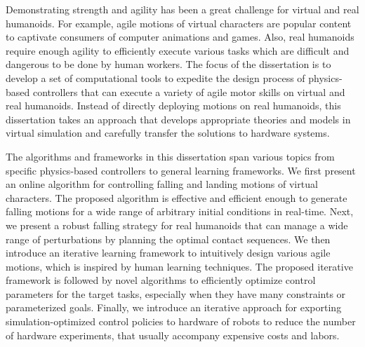 
Demonstrating strength and agility has been a great challenge for virtual and 
real humanoids.
For example, agile motions of virtual characters are popular content to 
captivate consumers of computer animations and games.
Also, real humanoids require enough agility to efficiently execute various
tasks which are difficult and dangerous to be done by human workers.
The focus of the dissertation is to develop a set of computational tools to
expedite the design process of physics-based controllers that can execute a
variety of agile motor skills on virtual and real humanoids.
Instead of directly deploying motions on real humanoids, this dissertation takes
an approach that develops appropriate theories and models in virtual simulation
and carefully transfer the solutions to hardware systems.

The algorithms and frameworks in this dissertation span various topics from
specific physics-based controllers to general learning frameworks.
We first present an online algorithm for controlling falling and landing
motions of virtual characters.
The proposed algorithm is effective and efficient enough to generate falling
motions for a wide range of arbitrary initial conditions in real-time.
Next, we present a robust falling strategy for real humanoids that can manage
a wide range of perturbations by planning the optimal contact sequences.
We then introduce an iterative learning framework to intuitively design various
agile motions, which is inspired by human learning techniques.
The proposed iterative framework is followed by novel algorithms to
efficiently optimize control parameters for the target tasks, especially when
they have many constraints or parameterized goals.
Finally, we introduce an iterative approach for exporting simulation-optimized
control policies to hardware of robots to reduce the number of hardware
experiments, that usually accompany expensive costs and labors.






